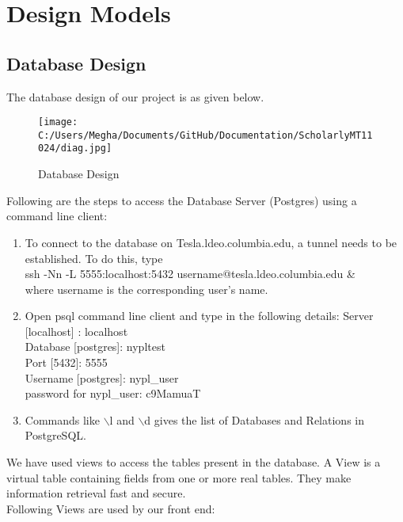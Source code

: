 \documentclass[amsart, 12pt]{article}
\begin{document}
\section{Design Models}
\subsection{Database Design}

The database design of our project is as given below.\\
\begin{figure}[ht!]
\centering
\texttt{[image: C:/Users/Megha/Documents/GitHub/Documentation/ScholarlyMT11024/diag.jpg]}
\caption{Database Design}
\label{fig:Phase 2}
\end{figure}

Following are the steps to access the Database Server (Postgres) using a command line client:
\begin{enumerate}
\item To connect to the database on Tesla.ldeo.columbia.edu, a tunnel needs to be established. To do this, type \\
ssh -Nn -L 5555:localhost:5432 username@tesla.ldeo.columbia.edu \& \\
where username is the corresponding user's name.
\item Open psql command line client and type in the following details:
Server [localhost] : localhost \\
Database [postgres]: nypltest \\
Port [5432]: 5555 \\
Username [postgres]: nypl\_user \\
password for nypl\_user: c9MamuaT \\
\item Commands like $\backslash$l and $\backslash$d gives the list of Databases and Relations in PostgreSQL.
\end{enumerate}
We have used views to access the tables present in the database. A View is a virtual table containing fields from one or more real tables. They make information retrieval fast and secure.\\
Following Views are used by our front end:
\end{document}
